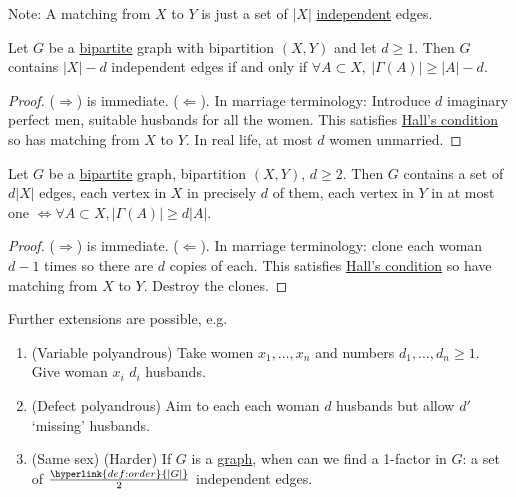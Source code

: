 \documentclass{article}
\begin{document}
Note: A matching from $X$ to $Y$ is just a set of $|X|$ \hyperlink{def:indepEdg}{independent} edges.
\begin{ncor}\label{cor:32}
    Let $G$ be a \hyperlink{def:bipartite}{bipartite} graph with bipartition $(X,Y)$ and let $d \geq 1$.
    Then $G$ contains $|X|-d$ independent edges if and only if $\forall A \subset X, \ |\Gamma(A)| \geq |A| - d$.
\end{ncor}
\begin{proof}
    ($\Rightarrow$) is immediate.
    ($\Leftarrow$). In marriage terminology: Introduce $d$ imaginary perfect men, suitable husbands for all the women.
    This satisfies \hyperlink{def:hall}{Hall's condition} so has matching from $X$ to $Y$.
    In real life, at most $d$ women unmarried.
\end{proof}
\begin{ncor}\label{cor:33}
    Let $G$ be a \hyperlink{def:bipartite}{bipartite} graph, bipartition $(X,Y)$, $d \geq 2$.
    Then $G$ contains a set of $d |X|$ edges, each vertex in $X$ in precisely $d$ of them, each vertex in $Y$ in at most one $\iff \forall A \subset X, |\Gamma(A)| \geq d |A|$.
\end{ncor}
\begin{proof}
    ($\Rightarrow$) is immediate.
    ($\Leftarrow$). In marriage terminology: clone each woman $d-1$ times so there are $d$ copies of each.
    This satisfies \hyperlink{def:hall}{Hall's condition} so have matching from $X$ to $Y$.
    Destroy the clones.
\end{proof}
Further extensions are possible, e.g.\
\begin{enumerate}[label=(\roman*)]
    \item (Variable polyandrous) Take women $x_1, \dotsc, x_n$ and numbers $d_1, \dotsc, d_n \geq 1$. Give woman $x_i$ $d_i$ husbands.
    \item (Defect polyandrous) Aim to each each woman $d$ husbands but allow $d'$ `missing' husbands.
    \item (Same sex) (Harder) If $G$ is a \hyperlink{def:graph}{graph}, when can we find a 1-factor in $G$: a set of $\frac{\hyperlink{def:order}{|G|}}{2}$ independent edges.
\end{enumerate}
\end{document}
